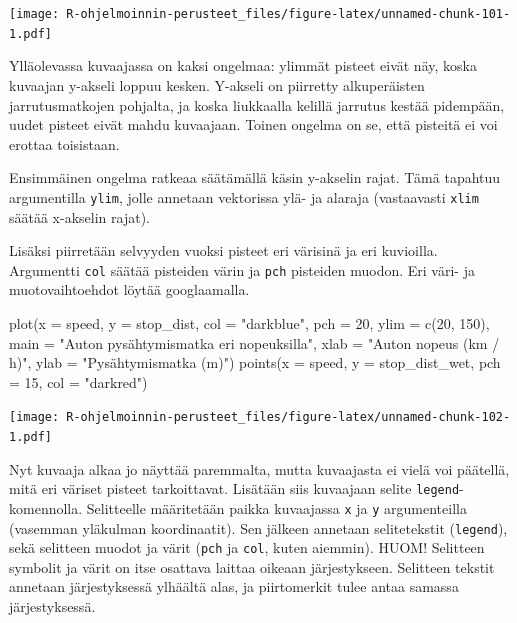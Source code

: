 \documentclass[
]{book}
\newenvironment{Shaded}{\begin{snugshade}}{\end{snugshade}}
\newcommand{\AttributeTok}[1]{\textcolor[rgb]{0.77,0.63,0.00}{#1}}
\newcommand{\DecValTok}[1]{\textcolor[rgb]{0.00,0.00,0.81}{#1}}
\newcommand{\FunctionTok}[1]{\textcolor[rgb]{0.00,0.00,0.00}{#1}}
\newcommand{\NormalTok}[1]{#1}
\newcommand{\StringTok}[1]{\textcolor[rgb]{0.31,0.60,0.02}{#1}}
\begin{document}
\texttt{[image: R-ohjelmoinnin-perusteet\_files/figure-latex/unnamed-chunk-101-1.pdf]}

Ylläolevassa kuvaajassa on kaksi ongelmaa: ylimmät pisteet eivät näy, koska kuvaajan y-akseli loppuu kesken. Y-akseli on piirretty alkuperäisten jarrutusmatkojen pohjalta, ja koska liukkaalla kelillä jarrutus kestää pidempään, uudet pisteet eivät mahdu kuvaajaan. Toinen ongelma on se, että pisteitä ei voi erottaa toisistaan.

Ensimmäinen ongelma ratkeaa säätämällä käsin y-akselin rajat. Tämä tapahtuu argumentilla \texttt{ylim}, jolle annetaan vektorissa ylä- ja alaraja (vastaavasti \texttt{xlim} säätää x-akselin rajat).

Lisäksi piirretään selvyyden vuoksi pisteet eri värisinä ja eri kuvioilla. Argumentti \texttt{col} säätää pisteiden värin ja \texttt{pch} pisteiden muodon. Eri väri- ja muotovaihtoehdot löytää googlaamalla.

\begin{Shaded}
\begin{Highlighting}[]
\FunctionTok{plot}\NormalTok{(}\AttributeTok{x =}\NormalTok{ speed, }\AttributeTok{y =}\NormalTok{ stop\_dist,}
     \AttributeTok{col =} \StringTok{"darkblue"}\NormalTok{, }\AttributeTok{pch =} \DecValTok{20}\NormalTok{,}
     \AttributeTok{ylim =} \FunctionTok{c}\NormalTok{(}\DecValTok{20}\NormalTok{, }\DecValTok{150}\NormalTok{),}
     \AttributeTok{main =} \StringTok{"Auton pysähtymismatka eri nopeuksilla"}\NormalTok{,}
     \AttributeTok{xlab =} \StringTok{"Auton nopeus (km / h)"}\NormalTok{, }\AttributeTok{ylab =} \StringTok{"Pysähtymismatka (m)"}\NormalTok{)}
\FunctionTok{points}\NormalTok{(}\AttributeTok{x =}\NormalTok{ speed, }\AttributeTok{y =}\NormalTok{ stop\_dist\_wet, }\AttributeTok{pch =} \DecValTok{15}\NormalTok{, }\AttributeTok{col =} \StringTok{"darkred"}\NormalTok{)}
\end{Highlighting}
\end{Shaded}

\texttt{[image: R-ohjelmoinnin-perusteet\_files/figure-latex/unnamed-chunk-102-1.pdf]}

Nyt kuvaaja alkaa jo näyttää paremmalta, mutta kuvaajasta ei vielä voi päätellä, mitä eri väriset pisteet tarkoittavat. Lisätään siis kuvaajaan selite \texttt{legend}-komennolla. Selitteelle määritetään paikka kuvaajassa \texttt{x} ja \texttt{y} argumenteilla (vasemman yläkulman koordinaatit). Sen jälkeen annetaan selitetekstit (\texttt{legend}), sekä selitteen muodot ja värit (\texttt{pch} ja \texttt{col}, kuten aiemmin). HUOM! Selitteen symbolit ja värit on itse osattava laittaa oikeaan järjestykseen. Selitteen tekstit annetaan järjestyksessä ylhäältä alas, ja piirtomerkit tulee antaa samassa järjestyksessä.
\end{document}
